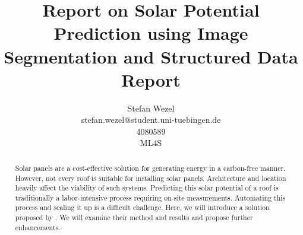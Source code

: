 \documentclass{article} %
\title{Report on Solar Potential Prediction using Image Segmentation and Structured Data\\ \vspace{0.5cm}\large{Report}}
\author{Stefan Wezel \\ stefan.wezel@student.uni-tuebingen.de \\4080589  \\ ML4S}
\def\figwidth{.5\linewidth}
\def\figheight{.15\textheight}
\begin{document}
\maketitle

\begin{abstract}
	Solar panels are a cost-effective solution for generating energy in a carbon-free manner. However, not every roof is suitable for installing solar panels. Architecture and location heavily affect the viability of such systems.
	Predicting this solar potential of a roof is traditionally a labor-intensive process requiring on-site measurements. Automating this process and scaling it up is a difficult challenge. Here, we will introduce a solution proposed by \citet{de2021predicting}. We will examine their method and results and propose further enhancements.
\end{abstract}
\end{document}
